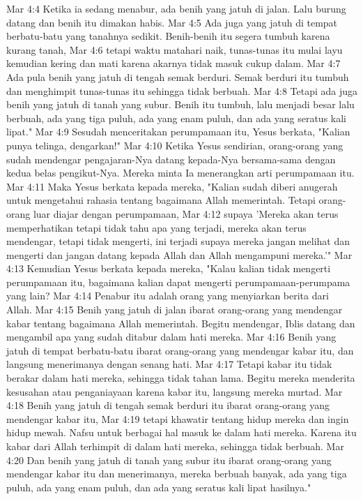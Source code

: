 Mar 4:4  Ketika ia sedang menabur, ada benih yang jatuh di jalan. Lalu burung datang dan benih itu dimakan habis.
Mar 4:5  Ada juga yang jatuh di tempat berbatu-batu yang tanahnya sedikit. Benih-benih itu segera tumbuh karena kurang tanah,
Mar 4:6  tetapi waktu matahari naik, tunas-tunas itu mulai layu kemudian kering dan mati karena akarnya tidak masuk cukup dalam.
Mar 4:7  Ada pula benih yang jatuh di tengah semak berduri. Semak berduri itu tumbuh dan menghimpit tunas-tunas itu sehingga tidak berbuah.
Mar 4:8  Tetapi ada juga benih yang jatuh di tanah yang subur. Benih itu tumbuh, lalu menjadi besar lalu berbuah, ada yang tiga puluh, ada yang enam puluh, dan ada yang seratus kali lipat."
Mar 4:9  Sesudah menceritakan perumpamaan itu, Yesus berkata, "Kalian punya telinga, dengarkan!"
Mar 4:10  Ketika Yesus sendirian, orang-orang yang sudah mendengar pengajaran-Nya datang kepada-Nya bersama-sama dengan kedua belas pengikut-Nya. Mereka minta Ia menerangkan arti perumpamaan itu.
Mar 4:11  Maka Yesus berkata kepada mereka, "Kalian sudah diberi anugerah untuk mengetahui rahasia tentang bagaimana Allah memerintah. Tetapi orang-orang luar diajar dengan perumpamaan,
Mar 4:12  supaya 'Mereka akan terus memperhatikan tetapi tidak tahu apa yang terjadi, mereka akan terus mendengar, tetapi tidak mengerti, ini terjadi supaya mereka jangan melihat dan mengerti dan jangan datang kepada Allah dan Allah mengampuni mereka.'"
Mar 4:13  Kemudian Yesus berkata kepada mereka, "Kalau kalian tidak mengerti perumpamaan itu, bagaimana kalian dapat mengerti perumpamaan-perumpama yang lain?
Mar 4:14  Penabur itu adalah orang yang menyiarkan berita dari Allah.
Mar 4:15  Benih yang jatuh di jalan ibarat orang-orang yang mendengar kabar tentang bagaimana Allah memerintah. Begitu mendengar, Iblis datang dan mengambil apa yang sudah ditabur dalam hati mereka.
Mar 4:16  Benih yang jatuh di tempat berbatu-batu ibarat orang-orang yang mendengar kabar itu, dan langsung menerimanya dengan senang hati.
Mar 4:17  Tetapi kabar itu tidak berakar dalam hati mereka, sehingga tidak tahan lama. Begitu mereka menderita kesusahan atau penganiayaan karena kabar itu, langsung mereka murtad.
Mar 4:18  Benih yang jatuh di tengah semak berduri itu ibarat orang-orang yang mendengar kabar itu,
Mar 4:19  tetapi khawatir tentang hidup mereka dan ingin hidup mewah. Nafsu untuk berbagai hal masuk ke dalam hati mereka. Karena itu kabar dari Allah terhimpit di dalam hati mereka, sehingga tidak berbuah.
Mar 4:20  Dan benih yang jatuh di tanah yang subur itu ibarat orang-orang yang mendengar kabar itu dan menerimanya, mereka berbuah banyak, ada yang tiga puluh, ada yang enam puluh, dan ada yang seratus kali lipat hasilnya."
